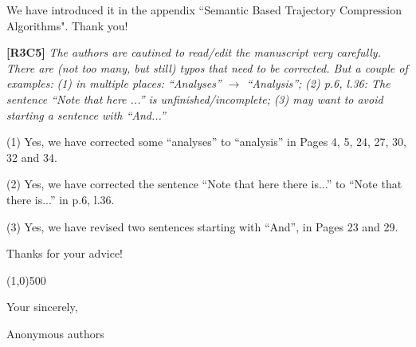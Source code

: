 \documentclass{letter}
\begin{document}

We have introduced it in the appendix ``Semantic Based Trajectory Compression Algorithms". Thank you!


\textbf{[R3C5]} \emph{The authors are cautined to read/edit the manuscript very carefully. There are (not too many, but still) typos that need to be corrected. But a couple of examples:}
  \emph{(1) in multiple places: ``Analyses'' $\rightarrow$ ``Analysis'';}
  \emph{(2) p.6, l.36: The sentence ``Note that here ...'' is unfinished/incomplete;}
  \emph{(3) may want to avoid starting a sentence with ``And...''}


(1) Yes, we have corrected some ``analyses'' to ``analysis'' in Pages 4, 5, 24, 27, 30, 32 and 34.

(2) Yes, we have corrected the sentence ``Note that here there is...'' to ``Note that there is...'' in p.6, l.36.

(3) Yes, we have revised two sentences starting with ``And'', in Pages 23 and 29.

Thanks for your advice!

\line(1,0){500}



Your sincerely,

Anonymous authors

%
%
\end{document}
